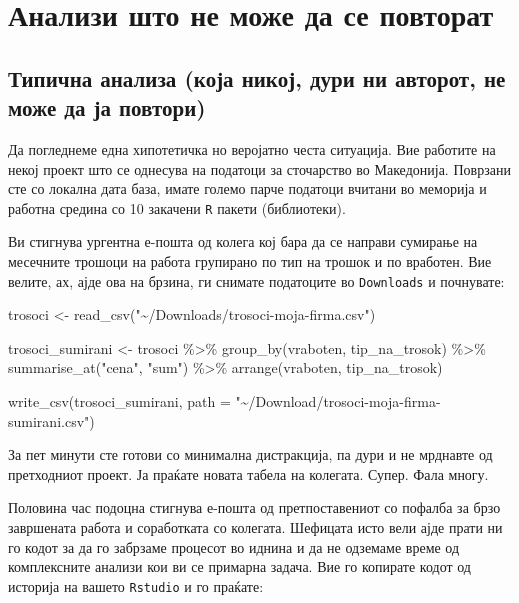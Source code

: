 \documentclass[
]{book}
\newenvironment{Shaded}{\begin{snugshade}}{\end{snugshade}}
\newcommand{\AttributeTok}[1]{\textcolor[rgb]{0.77,0.63,0.00}{#1}}
\newcommand{\FunctionTok}[1]{\textcolor[rgb]{0.00,0.00,0.00}{#1}}
\newcommand{\NormalTok}[1]{#1}
\newcommand{\OtherTok}[1]{\textcolor[rgb]{0.56,0.35,0.01}{#1}}
\newcommand{\SpecialCharTok}[1]{\textcolor[rgb]{0.00,0.00,0.00}{#1}}
\newcommand{\StringTok}[1]{\textcolor[rgb]{0.31,0.60,0.02}{#1}}
\begin{document}
\hypertarget{nogood}{%
\chapter{Анализи што не може да се повторат}\label{nogood}}

\hypertarget{typical}{%
\section{Типична анализа (која никој, дури ни авторот, не може да ја повтори)}\label{typical}}

Да погледнеме една хипотетичка но веројатно честа ситуација. Вие работите на некој проект што се однесува на податоци за сточарство во Македонија. Поврзани сте со локална дата база, имате големо парче податоци вчитани во меморија и работна средина со 10 закачени \texttt{R} пакети (библиотеки).

Ви стигнува ургентна е-пошта од колега кој бара да се направи сумирање на месечните трошоци на работа групирано по тип на трошок и по вработен. Вие велите, ах, ајде ова на брзина, ги снимате податоците во \texttt{Downloads} и почнувате:

\begin{Shaded}
\begin{Highlighting}[]
\NormalTok{trosoci }\OtherTok{\textless{}{-}} \FunctionTok{read\_csv}\NormalTok{(}\StringTok{"\textasciitilde{}/Downloads/trosoci{-}moja{-}firma.csv"}\NormalTok{)}

\NormalTok{trosoci\_sumirani }\OtherTok{\textless{}{-}}\NormalTok{ trosoci }\SpecialCharTok{\%\textgreater{}\%} 
  \FunctionTok{group\_by}\NormalTok{(vraboten, tip\_na\_trosok) }\SpecialCharTok{\%\textgreater{}\%} 
  \FunctionTok{summarise\_at}\NormalTok{(}\StringTok{"cena"}\NormalTok{, }\StringTok{"sum"}\NormalTok{) }\SpecialCharTok{\%\textgreater{}\%} 
  \FunctionTok{arrange}\NormalTok{(vraboten, tip\_na\_trosok)}

\FunctionTok{write\_csv}\NormalTok{(trosoci\_sumirani, }
          \AttributeTok{path =} \StringTok{"\textasciitilde{}/Download/trosoci{-}moja{-}firma{-}sumirani.csv"}\NormalTok{)}
\end{Highlighting}
\end{Shaded}

За пет минути сте готови со минимална дистракција, па дури и не мрднавте од претходниот проект. Ја праќате новата табела на колегата. Супер. Фала многу.

Половина час подоцна стигнува е-пошта од претпоставениот со пофалба за брзо завршената работа и соработката со колегата. Шефицата исто вели ајде прати ни го кодот за да го забрзаме процесот во иднина и да не одземаме време од комплексните анализи кои ви се примарна задача. Вие го копирате кодот од историја на вашето \texttt{Rstudio} и го праќате:
\end{document}
